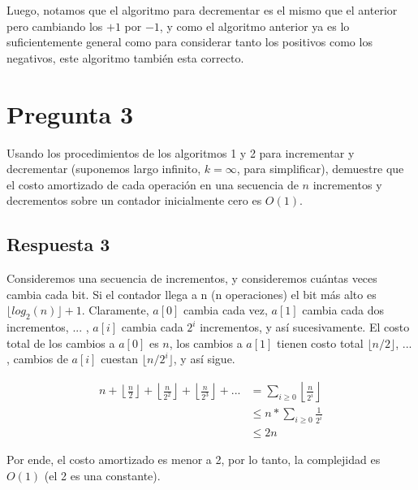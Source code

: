 \documentclass[spanish, fleqn]{article}
\begin{document}
Luego, notamos que el algoritmo para decrementar es el mismo que el anterior pero cambiando los $+1$ por $-1$, y como el algoritmo anterior ya es lo suficientemente general como para considerar tanto los positivos como los negativos, este algoritmo también esta correcto.


\section{Pregunta 3}
Usando los procedimientos de los algoritmos 1 y 2 para incrementar y decrementar (suponemos largo infinito, $k = \infty$, para simplificar), demuestre que el costo amortizado de cada operación en una secuencia de $n$ incrementos y decrementos sobre un contador inicialmente cero es $O(1)$.

\subsection{Respuesta 3}

Consideremos una secuencia de incrementos, y consideremos cuántas veces cambia cada bit. Si el contador llega a n (n operaciones) el bit más alto es $\lfloor log_{2}(n)\rfloor + 1$. Claramente, $a[0]$ cambia cada vez, $a[1]$ cambia cada dos incrementos, ... , $a[i]$ cambia cada $2^{i}$ incrementos, y así
sucesivamente. El costo total de los cambios a $a[0]$ es $n$, los cambios a $a[1]$ tienen costo total $\lfloor n/2\rfloor$, ... , cambios de $a[i]$ cuestan $\lfloor n/2^i\rfloor$, y así sigue.

\begin{align*}
    n + \left\lfloor\frac{n}{2}\right\rfloor + \left\lfloor \frac{n}{2^2}\right\rfloor + \left\lfloor \frac{n}{2^3}\right\rfloor + ...   &= \sum_{i\geq0}{\left\lfloor \frac{n}{2^i
    }\right\rfloor} \\
    & \leq n * \sum_{i\geq0}{\frac{1}{2^i
    }} \\
    & \leq 2n
\end{align*}

Por ende, el costo amortizado es menor a 2, por lo tanto,  la complejidad es $O(1)$ (el 2 es una constante).
\end{document}

